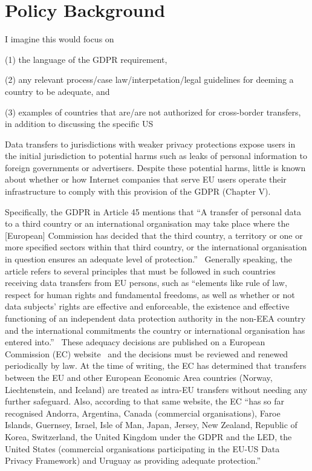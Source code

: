 \section{Policy Background}
\label{sec:policy}
 I imagine this would focus on 
 
 (1) the language of the GDPR requirement, 
 
 (2) any relevant process/case law/interpetation/legal guidelines for deeming a country to be adequate, and 
 
 (3) examples of countries that are/are not authorized for cross-border transfers, in addition to discussing the specific US 
 \fi
 

Data transfers to jurisdictions with weaker privacy protections
expose users in the initial jurisdiction to potential harms
such as leaks of personal information to foreign governments
or advertisers. 
Despite these potential harms, little is known about whether or how 
Internet companies that serve EU users operate their 
infrastructure to comply with this provision of the GDPR (Chapter V). 

Specifically, the GDPR in Article 45 mentions that 
``A transfer of personal data to a third country or an international organisation may take place where the [European] 
Commission has decided that the third country, a territory 
or one or more specified sectors within that third country, or the 
international organisation in question ensures an adequate level of protection.''~\cite{gdpreu}
Generally speaking, the article refers to several principles that must be followed 
in such countries receiving data transfers from EU persons, 
such as ``elements like rule of law, respect for human rights and 
fundamental freedoms, as well as whether or not data subjects' 
rights are effective and enforceable, the existence and effective 
functioning of an independent data protection authority in the non-EEA 
country and the international commitments the country or 
international organisation has entered into.''~\cite{edpb}
These adequacy decisions are published on a European Commission (EC) 
website~\cite{Adequacy38:online} and the decisions must be reviewed 
and renewed periodically by law. At the time of writing, the EC has 
determined that transfers between the EU and other European Economic Area countries 
(Norway, Liechtenstein, and Iceland) are treated as intra-EU 
transfers without needing any further safeguard. Also, according to that 
same website, the EC ``has so far recognised Andorra, Argentina, Canada 
(commercial organisations), Faroe Islands, Guernsey, Israel, Isle of Man, 
Japan, Jersey, New Zealand, Republic of Korea, Switzerland, the United 
Kingdom under the GDPR and the LED, the United States (commercial 
organisations participating in the EU-US Data Privacy Framework) 
and Uruguay as providing adequate protection.'' 

